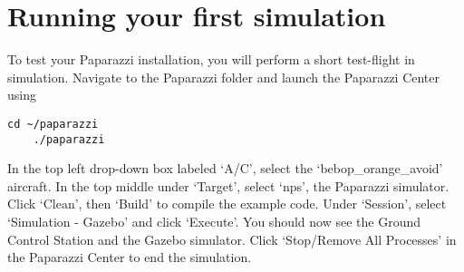 \section{Running your first simulation}
To test your Paparazzi installation, you will perform a short test-flight in simulation.
Navigate to the Paparazzi folder and launch the Paparazzi Center using

\begin{lstlisting}[style=Bash]
	cd ~/paparazzi
	./paparazzi
\end{lstlisting}

In the top left drop-down box labeled `A/C', select the `bebop\_orange\_avoid' aircraft.
In the top middle under `Target', select `nps', the Paparazzi simulator.
Click `Clean', then `Build' to compile the example code.
Under `Session', select `Simulation - Gazebo' and click `Execute'. You should now see the Ground Control Station and the Gazebo simulator.
Click `Stop/Remove All Processes' in the Paparazzi Center to end the simulation.

